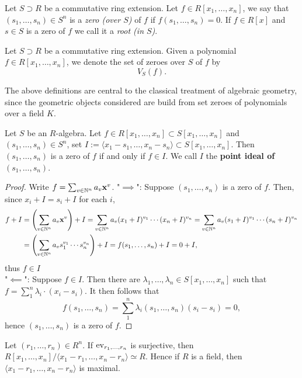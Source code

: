 \begin{definition}
    Let $S\supset R$ be a commutative ring extension. Let $f\in R[x_1,\dots,x_n]$, we say that $(s_1,\dots, s_n)\in S^n$ is a \textit{zero (over $S$)} of $f$ if $f(s_1,\dots,s_n)= 0$. If $f\in R[x]$ and $s\in S$ is a zero of $f$ we call it a \textit{root (in $S$)}.\\  
\end{definition}
\begin{definition}
    Let $S\supset R$ be a commutative ring extension. Given a polynomial $f\in R[x_1,\dots,x_n]$, we denote the set of zeroes over $S$ of $f$ by 
    $$V_S(f).$$
\end{definition}
The above definitions are central to the classical treatment of algebraic geometry, since the geometric objects considered are build from set zeroes of polynomials over a field $K$. 
\begin{proposition}\label{AZeroIffPolynomialIsInPointIdeal}
    Let $S$ be an $R$-algebra. Let $f\in R[x_1,\dots,x_n]\subset S[x_1,\dots,x_n]$ and $(s_1,\dots,s_n)\in S^n $, set $I :=\langle x_1-s_1,\dots,x_n-s_n\rangle\subset S[x_1,\dots,x_n] $. Then $(s_1,\dots,s_n)$ is a zero of $f$ if and only if $f\in I$. We call $I$ the \textbf{point ideal of $(s_1,\dots,s_n)$}.
\end{proposition}
\begin{proof}
    Write $f = \sum_{v\in \mathbb{N}^n} a_v \mathbf{x}^v$.
    "$\implies$": Suppose $(s_1,\dots,s_n)$ is a zero of $f$. Then, since $x_i + I = s_i + I$ for each $i$, 
    \begin{align*} 
        f + I &= \left(\sum_{v\in \mathbb{N}^n} a_v \mathbf{x}^v\right) + I = \sum_{v\in \mathbb{N}^n} a_v(x_1+I)^{v_1}\cdots(x_n+I)^{v_n} = \sum_{v\in \mathbb{N}^n} a_v(s_1+I)^{v_1}\cdots(s_n+I)^{v_n}  \\ 
        &= \left(\sum_{v\in \mathbb{N}^n} a_v s_1^{v_1}\cdots s_n^{v_n}\right) +I = f(s_1,\dots,s_n) + I = 0 + I,
    \end{align*}
    thus $f \in I$\\
    "$\impliedby$": Suppose $f\in I$. Then there are $\lambda_1,\dots,\lambda_n\in S[x_1,\dots,x_n]$ such that $f = \sum_1^n \lambda_i\cdot(x_i-s_i)$. It then follows that 
    $$f(s_1,\dots,s_n) = \sum_1^n \lambda_i(s_1,\dots,s_n)(s_i-s_i) = 0,$$
    hence $(s_1,\dots, s_n)$ is a zero of $f$.
\end{proof}
\begin{corollary}\label{MaximalIdealsOfPolynomialRings}
    Let $(r_1,\dots,r_n)\in R^n$. If $\mathrm{ev}_{r_1,\dots,r_n}$ is surjective, then $R[x_1,\dots,x_n]/\langle x_1-r_1,\dots,x_n-r_n\rangle \simeq R$. Hence if $R$ is a field, then $\langle x_1-r_1,\dots,x_n-r_n\rangle$ is maximal. 
\end{corollary}
